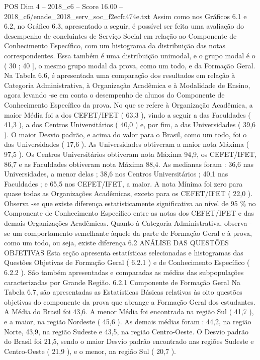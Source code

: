 \begin{textsample}{POS Dim 4 – 2018\_c6 – Score 16.00 – 2018\_c6/enade\_2018\_serv\_soc\_f2ecfc474e.txt}
Assim como nos Gráficos 6.1 e 6.2, no Gráfico 6.3, apresentado a seguir, é possível ser feita uma avaliação do desempenho de concluintes de Serviço Social em relação ao Componente de Conhecimento Específico, com um histograma da distribuição das notas correspondentes.
Essa também é uma distribuição unimodal, e o grupo modal é o ( 30 ; 40 ], o mesmo grupo modal da prova, como um todo, e da Formação Geral.
Na Tabela 6.6, é apresentada uma comparação dos resultados em relação à Categoria Administrativa, à Organização Acadêmica e à Modalidade de Ensino, agora levando -se em conta o desempenho de alunos do Componente de Conhecimento Específico da prova.
No que se refere à Organização Acadêmica, a maior Média foi a dos CEFET/IFET ( 63,3 ), vindo a seguir a das Faculdades ( 41,3 ), a dos Centros Universitários ( 40,0 ) e, por fim, a das Universidades ( 39,6 ).
O maior Desvio padrão, e acima do valor para o Brasil, como um todo, foi o das Universidades ( 17,6 ).
As Universidades obtiveram a maior nota Máxima ( 97,5 ).
Os Centros Universitários obtiveram nota Máxima 94,9, os CEFET/IFET, 86,7 e as Faculdades obtiveram nota Máxima 88,4.
As medianas foram : 36,6 nas Universidades, a menor delas ; 38,6 nos Centros Universitários ; 40,1 nas Faculdades ; e 65,5 nos CEFET/IFET, a maior.
A nota Mínima foi zero para quase todas as Organizações Acadêmicas, exceto para os CEFET/IFET ( 22,0 ).
Observa -se que existe diferença estatisticamente significativa ao nível de 95 \% no Componente de Conhecimento Específico entre as notas dos CEFET/IFET e das demais Organizações Acadêmicas.
Quanto à Categoria Administrativa, observa -se um comportamento semelhante àquele da parte de Formação Geral e à prova, como um todo, ou seja, existe diferença 6.2 ANÁLISE DAS QUESTÕES OBJETIVAS Esta seção apresenta estatísticas selecionadas e histogramas das Questões Objetivas de Formação Geral ( 6.2.1 ) e de Conhecimento Específico ( 6.2.2 ).
São também apresentadas e comparadas as médias das subpopulações caracterizadas por Grande Região. 6.2.1 Componente de Formação Geral Na Tabela 6.7, são apresentadas as Estatísticas Básicas relativas às oito questões objetivas do componente da prova que abrange a Formação Geral dos estudantes.
A Média do Brasil foi 43,6.
A menor Média foi encontrada na região Sul ( 41,7 ), e a maior, na região Nordeste ( 45,6 ).
As demais médias foram : 44,2, na região Norte, 43,9, na região Sudeste e 43,5, na região Centro-Oeste.
O Desvio padrão do Brasil foi 21,5, sendo o maior Desvio padrão encontrado nas regiões Sudeste e Centro-Oeste ( 21,9 ), e o menor, na região Sul ( 20,7 ).

\end{textsample}
